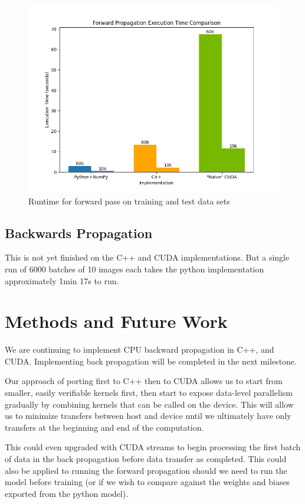 \documentclass[sigconf,authorversion,nonacm]{acmart}
\begin{document}
\begin{figure}[H]
    \centering
    \includegraphics[width=0.9\linewidth]{images/forward_prop_time_comparison.png}
    \caption{Runtime for forward pass on training and test data sets}
    \label{fig:enter-label}
\end{figure}

\subsection{Backwards Propagation}
This is not yet finished on the C++ and CUDA implementations. But a single run of 6000 batches of 10 images each takes the python implementation approximately 1min 17s to run.

\section{Methods and Future Work}

We are continuing to implement CPU backward propagation in C++, and CUDA. Implementing back propagation will be completed in the next milestone.

Our approach of porting first to C++ then to CUDA allows us to start from smaller, easily verifiable kernels first, then start to expose data-level parallelism gradually by combining kernels that can be called on the device. This will allow us to minimize transfers between host and device until we ultimately have only transfers at the beginning and end of the computation. 

This could even upgraded with CUDA streams to begin processing the first batch of data in the back propagation before data transfer as completed. This could also be applied to running the forward propagation should we need to run the model before training (or if we wish to compare against the weights and biases exported from the python model).
\end{document}
